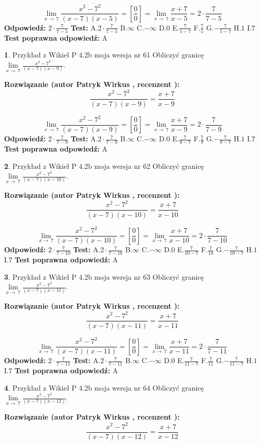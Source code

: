 \documentclass[12pt, a4paper]{article}
\theoremstyle{definition} %
\newtheorem{zad}{}
\newcommand{\zadStart}[1]{\begin{zad}#1\newline}
\newcommand{\zadStop}{\end{zad}}
\newcommand{\rozwStart}[2]{\noindent \textbf{Rozwiązanie (autor #1 , recenzent #2): }\newline}
\newcommand{\rozwStop}{\newline}
\newcommand{\odpStart}{\noindent \textbf{Odpowiedź:}\newline}
\newcommand{\odpStop}{\newline}
\newcommand{\testStart}{\noindent \textbf{Test:}\newline}
\newcommand{\testStop}{\newline}
\newcommand{\kluczStart}{\noindent \textbf{Test poprawna odpowiedź:}\newline}
\newcommand{\kluczStop}{\newline}
\begin{document}
$$\lim\limits_{x\to\ 7}\frac{x^{2}-7^{2}}{(x-7)(x-5)}=[\frac{0}{0}]=\lim\limits_{x\to\ 7}\frac{x+7}{x-5}=2 \cdot \frac{7}{7-5}$$
\rozwStop
\odpStart
$2 \cdot \frac{7}{7-5}$
\odpStop
\testStart
A.$2 \cdot \frac{7}{7-5}$
B.$\infty$
C.$-\infty$
D.$0$
E.$\frac{7}{5-7}$
F.$\frac{7}{5}$
G.$-\frac{7}{5-7}$
H.$1$
I.$7$
\testStop
\kluczStart
A
\kluczStop



\zadStart{Przykład z Wikieł P 4.2b moja wersja nr 61}
Obliczyć granicę $\lim\limits_{x\to\ 7}\frac{x^{2}-7^{2}}{(x-7)(x-9)}$.
\zadStop
\rozwStart{Patryk Wirkus}{}
$$\frac{x^{2}-7^{2}}{(x-7)(x-9)}=\frac{x+7}{x-9}$$

$$\lim\limits_{x\to\ 7}\frac{x^{2}-7^{2}}{(x-7)(x-9)}=[\frac{0}{0}]=\lim\limits_{x\to\ 7}\frac{x+7}{x-9}=2 \cdot \frac{7}{7-9}$$
\rozwStop
\odpStart
$2 \cdot \frac{7}{7-9}$
\odpStop
\testStart
A.$2 \cdot \frac{7}{7-9}$
B.$\infty$
C.$-\infty$
D.$0$
E.$\frac{7}{9-7}$
F.$\frac{7}{9}$
G.$-\frac{7}{9-7}$
H.$1$
I.$7$
\testStop
\kluczStart
A
\kluczStop



\zadStart{Przykład z Wikieł P 4.2b moja wersja nr 62}
Obliczyć granicę $\lim\limits_{x\to\ 7}\frac{x^{2}-7^{2}}{(x-7)(x-10)}$.
\zadStop
\rozwStart{Patryk Wirkus}{}
$$\frac{x^{2}-7^{2}}{(x-7)(x-10)}=\frac{x+7}{x-10}$$

$$\lim\limits_{x\to\ 7}\frac{x^{2}-7^{2}}{(x-7)(x-10)}=[\frac{0}{0}]=\lim\limits_{x\to\ 7}\frac{x+7}{x-10}=2 \cdot \frac{7}{7-10}$$
\rozwStop
\odpStart
$2 \cdot \frac{7}{7-10}$
\odpStop
\testStart
A.$2 \cdot \frac{7}{7-10}$
B.$\infty$
C.$-\infty$
D.$0$
E.$\frac{7}{10-7}$
F.$\frac{7}{10}$
G.$-\frac{7}{10-7}$
H.$1$
I.$7$
\testStop
\kluczStart
A
\kluczStop



\zadStart{Przykład z Wikieł P 4.2b moja wersja nr 63}
Obliczyć granicę $\lim\limits_{x\to\ 7}\frac{x^{2}-7^{2}}{(x-7)(x-11)}$.
\zadStop
\rozwStart{Patryk Wirkus}{}
$$\frac{x^{2}-7^{2}}{(x-7)(x-11)}=\frac{x+7}{x-11}$$

$$\lim\limits_{x\to\ 7}\frac{x^{2}-7^{2}}{(x-7)(x-11)}=[\frac{0}{0}]=\lim\limits_{x\to\ 7}\frac{x+7}{x-11}=2 \cdot \frac{7}{7-11}$$
\rozwStop
\odpStart
$2 \cdot \frac{7}{7-11}$
\odpStop
\testStart
A.$2 \cdot \frac{7}{7-11}$
B.$\infty$
C.$-\infty$
D.$0$
E.$\frac{7}{11-7}$
F.$\frac{7}{11}$
G.$-\frac{7}{11-7}$
H.$1$
I.$7$
\testStop
\kluczStart
A
\kluczStop



\zadStart{Przykład z Wikieł P 4.2b moja wersja nr 64}
Obliczyć granicę $\lim\limits_{x\to\ 7}\frac{x^{2}-7^{2}}{(x-7)(x-12)}$.
\zadStop
\rozwStart{Patryk Wirkus}{}
$$\frac{x^{2}-7^{2}}{(x-7)(x-12)}=\frac{x+7}{x-12}$$
\end{document}
